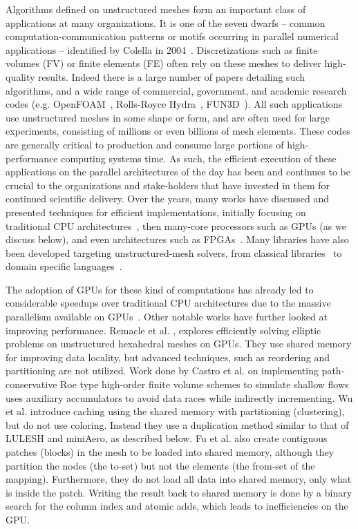 \noindent
Algorithms defined on unstructured meshes form an important 
class of applications at many organizations. It is one of the seven dwarfs -- 
common computation-communication patterns or motifs occurring in parallel 
numerical applications -- identified by Colella in 2004~\cite{Colella2004}. 
Discretizations such as finite volumes (FV) or finite elements (FE) often rely 
on these meshes to deliver high-quality results. Indeed there is a large number 
of papers detailing such algorithms, and a wide range of commercial, government, 
and academic research codes (e.g. OpenFOAM~\cite{OpenFoamUserGuide}, Rolls-Royce 
Hydra~\cite{moinier2002edge}, FUN3D~\cite{biedron2017fun3d}). All such 
applications use unstructured meshes in some shape or form, and are often used 
for large experiments, consisting of millions or even billions of mesh elements. 
These codes are generally critical to production and consume large portions of 
high-performance computing systems time. As such, the efficient execution of 
these applications on the parallel architectures of the day has been and 
continues to be crucial to the organizations and stake-holders that have 
invested in them for continued scientific delivery. Over the years, many works 
have discussed and presented techniques for efficient implementations, initially 
focusing on traditional CPU architectures~\cite{mavriplis2002parallel, 
jin1999openmp}, then many-core processors such as GPUs (as we discuss below), 
and even architectures such as FPGAs~\cite{nagy2014accelerating, 
akamine2012reconfigurable}. Many libraries have also been developed targeting 
unstructured-mesh solvers, from classical libraries~\cite{trilinos, PETSc} to 
domain specific languages~\cite{devito2011liszt, giles2012op2, pyfr2016}. 

The adoption of GPUs for these kind of computations has already led to 
considerable speedups over traditional CPU architectures due to the 
massive parallelism available on GPUs~\cite{Reguly2015, ELSEN200810148, 
cohen2009fast}. Other notable works have further looked at improving 
performance. Remacle et al. \cite{remacle2016gpu}, explores efficiently solving 
elliptic problems on unstructured hexahedral meshes on GPUs. They use shared 
memory for improving data locality, but advanced techniques, such as reordering 
and partitioning are not utilized. Work done by Castro et al. 
\cite{shallow_water} on implementing path-conservative Roe type high-order 
finite volume schemes to simulate shallow flows uses auxiliary accumulators to 
avoid data races while indirectly incrementing. Wu et al. 
\cite{wu2013complexity} introduce caching using the shared memory with 
partitioning (clustering), but do not use coloring. Instead they use a 
duplication method similar to that of LULESH and miniAero, as described below. 
Fu et al. \cite{fu2014architecting} also create contiguous patches (blocks) in 
the mesh to be loaded into shared memory, although they partition the nodes (the 
to-set) but not the elements (the from-set of the mapping). Furthermore, they do 
not load all data into shared memory, only what is inside the patch. Writing the 
result back to shared memory is done by a binary search for the column index and 
atomic adds, which leads to inefficiencies on the GPU. 

